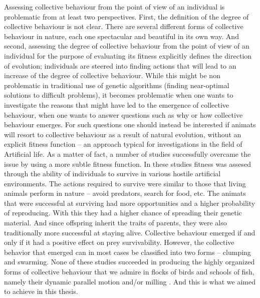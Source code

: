 Assessing collective behaviour from the point of view of an individual is problematic from at least two perspectives. First, the definition of the degree of collective behaviour is not clear. There are several different forms of collective behaviour in nature, each one spectacular and beautiful in its own way. And second, assessing the degree of collective behaviour from the point of view of an individual for the purpose of evaluating its fitness explicitly defines the direction of evolution; individuals are steered into finding actions that will lead to an increase of the degree of collective behaviour. While this might be non problematic in traditional use of genetic algorithms (finding near-optimal solutions to difficult problems), it becomes problematic when one wants to investigate the reasons that might have led to the emergence of collective behaviour, \ie when one wants to answer questions such as why or how collective behaviour emerges. For such questions one should instead be interested if animats will resort to collective behaviour as a result of natural evolution, without an explicit fitness function -- an approach typical for investigations in the field of Artificial life. As a matter of fact, a number of studies \cite{biswas2014causes,hein2015evolution,olson2013predator,olson2015exploring,olson2016evolution,witkowski2016emergence} successfully overcame the issue by using a more subtle fitness function. In these studies fitness was assesed through the ability of individuals to survive in various hostile artificial environments. The actions required to survive were similar to those that living animals perform in nature -- avoid predators, search for food, etc. The animats that were successful at surviving had more opportunities and a higher probability of reproducing. With this they had a higher chance of spreading their genetic material. And since offspring inherit the traits of parents, they were also traditionally more successful at staying alive. Collective behaviour emerged if and only if it had a positive effect on prey survivability. However, the collective behavior that emerged can in most cases \cite{biswas2014causes,hein2015evolution,olson2013predator,olson2015exploring,olson2016evolution,witkowski2016emergence} be classified into two forms -- clumping and swarming. None of these studies succeeded in producing the highly organized forms of collective behaviour that we admire in flocks of birds and schools of fish, namely their dynamic parallel motion and/or milling \cite{couzin2002collective,sumpter2006principles}. And this is what we aimed to achieve in this thesis.

